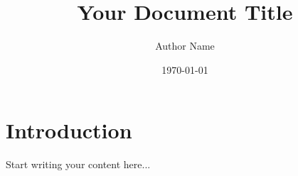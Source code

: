 \documentclass[12pt]{article}
\title{Your Document Title}
\author{Author Name}
\date{\today}
\begin{document}
\maketitle

\section{Introduction}
Start writing your content here...
\end{document}
